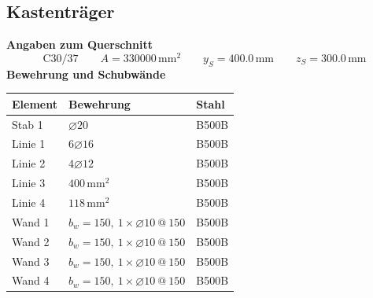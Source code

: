 \documentclass[11pt,a4paper]{article}
\begin{document}
\subsection{Kastenträger}
\noindent\textbf{Angaben zum Querschnitt}
\begin{equation*}
\text{C30/37} \qquad A = 330000\,\mathrm{mm}^2 \qquad y_S = 400.0\,\mathrm{mm} \qquad z_S = 300.0\,\mathrm{mm}
\end{equation*}
\noindent\textbf{Bewehrung und Schubwände}
\begin{longtable}{lll}
\hline
Element & Bewehrung & Stahl \\
\hline
\endhead
Stab 1 & $\varnothing 20$ & B500B \\
Linie 1 & $6 \varnothing 16$ & B500B \\
Linie 2 & $4 \varnothing 12$ & B500B \\
Linie 3 & $400\,\mathrm{mm}^2$ & B500B \\
Linie 4 & $118\,\mathrm{mm}^2$ & B500B \\
Wand 1 & $b_w = 150,\ 1 \times \varnothing 10\ @\ 150$ & B500B \\
Wand 2 & $b_w = 150,\ 1 \times \varnothing 10\ @\ 150$ & B500B \\
Wand 3 & $b_w = 150,\ 1 \times \varnothing 10\ @\ 150$ & B500B \\
Wand 4 & $b_w = 150,\ 1 \times \varnothing 10\ @\ 150$ & B500B \\
\hline
\end{longtable}
\end{document}
